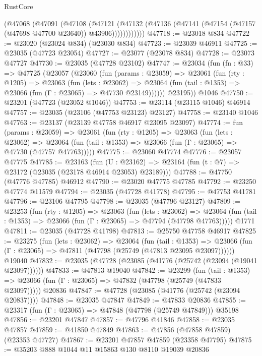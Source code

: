 \begin{lexlean}{RustCore}
\begin{coremodule}
            (@47068
              (@47091
                (@47108
                  (@47121
                    (@47132
                      (@47136 (@47141 (@47154 (@47157 (@47698 @47700 @23640)) @43906))))))))))))
@47718 := @23018 @834
@47722 := @23020 (@23024 @834) (@23030 @834)
@47723 := @23039 @46911
@47725 := @23035 (@47723 @23054)
@47727 := @23077 (@23078 @834)
@47728 := @23073 @47727
@47730 := @23035 (@47728 @23102)
@47747 := @23034
    (fun (fn : @33) =>
    @47725
      (@23057
        (@23060
          (fun (params : @23059) =>
          @23061
            (fun (rty : @1205) =>
            @23063
              (fun (lets : @23062) =>
              @23064 (fun (tail : @1353) => @23066 (fun (Γ : @23065) => @47730 @23149))))))
        @23195))
    @1046
@47750 := @23201 (@47723 (@23052 @1046))
@47753 := @23114 (@23115 @1046) @46914
@47757 := @23035 (@23106 (@47753 @23123) @23127)
@47758 := @23140 @1046
@47763 := @23137 (@23139 @47758 @46917 @23095 @23097)
@47774 := fun (params : @23059) =>
  @23061
    (fun (rty : @1205) =>
    @23063
      (fun (lets : @23062) =>
      @23064 (fun (tail : @1353) => @23066 (fun (Γ : @23065) => @47730 (@47757 @47763)))))
@47775 := @23060 @47774
@47776 := @23057 @47775
@47785 := @23163
    (fun (U : @23162) => @23164 (fun (t : @7) => @23172 (@23035 (@23178 @46914 @23053) @23189)))
@47788 := @47750 (@47776 @47785) @46912
@47790 := @23020 @47775 @47785
@47792 := @23250 @47774 @11579
@47794 := @23035 (@47728 @41778)
@47795 := @47753 @41781
@47796 := @23106 @47795
@47798 := @23035 (@47796 @23127)
@47809 := @23253
    (fun (rty : @1205) =>
    @23063
      (fun (lets : @23062) =>
      @23064 (fun (tail : @1353) => @23066 (fun (Γ : @23065) => @47794 (@47798 @47763)))))
    @1771
@47811 := @23035 (@47728 @41798)
@47813 := @25750 @47758 @46917
@47825 := @23275
    (fun (lets : @23062) =>
    @23064
      (fun (tail : @1353) =>
      @23066 (fun (Γ : @23065) => @47811 (@47798 (@25749 (@47813 @23095 @23097))))))
    @19040
@47832 := @23035 (@47728 (@23085 (@41776 (@25742 (@23094 (@19041 @23097))))))
@47833 := @47813 @19040
@47842 := @23299
    (fun (tail : @1353) => @23066 (fun (Γ : @23065) => @47832 (@47798 (@25749 (@47833 @23097)))))
    @20836
@47847 := @47728 (@23085 (@41776 (@25742 (@23094 @20837))))
@47848 := @23035 @47847
@47849 := @47833 @20836
@47855 := @23317 (fun (Γ : @23065) => @47848 (@47798 (@25749 @47849))) @35198
@47856 := @23201 @47847
@47857 := @47796 @41846
@47858 := @23035 @47857
@47859 := @41850 @47849
@47863 := @47856 (@47858 @47859) (@23353 @47727)
@47867 := @23201 @47857 @47859 (@23358 @47795)
@47875 := @35203 @888 @1044 @11 @15863 @130 @8110 @19039 @20836

\end{coremodule}
\end{lexlean}
